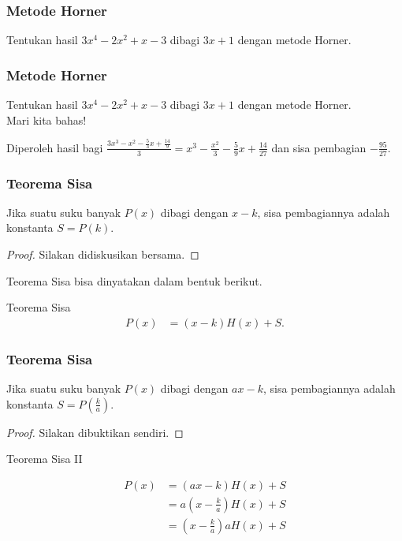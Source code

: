 \documentclass[11pt]{beamer}
\begin{document}
	\begin{frame}
		\frametitle{Metode Horner}
		Tentukan hasil $3x^4-2x^2+x-3$ dibagi $3x+1$ dengan metode Horner. 
		
	\end{frame}
	
	\begin{frame}
		\frametitle{Metode Horner}
		Tentukan hasil $3x^4-2x^2+x-3$ dibagi $3x+1$ dengan metode Horner.\\
		Mari kita bahas!
		\begin{center}
		\end{center}
		Diperoleh hasil bagi $\frac{3x^3-x^2-\frac{5}{3}x+\frac{14}{9}}{3}=x^3-\frac{x^2}{3}-\frac{5}{9}x+\frac{14}{27}$ dan sisa pembagian $-\frac{95}{27}$.
	\end{frame}
	
	\begin{frame}
		\frametitle{Teorema Sisa}
		
		\begin{theorem}
			Jika suatu suku banyak $P(x)$ dibagi dengan $x-k$, sisa pembagiannya adalah konstanta $S=P(k)$.
		\end{theorem}
		
		\begin{proof}
			Silakan didiskusikan bersama.
		\end{proof}
		
		Teorema Sisa bisa dinyatakan dalam bentuk berikut.
		\begin{block}{Teorema Sisa}
			\begin{align*}
				P(x)&=(x-k)H(x)+S.
			\end{align*}
		\end{block}
	\end{frame}
	
	\begin{frame}
		\frametitle{Teorema Sisa}
		\begin{theorem}
			Jika suatu suku banyak $P(x)$ dibagi dengan $ax-k$, sisa pembagiannya adalah konstanta $S = P(\frac{k}{a})$.
		\end{theorem}
		
		\begin{proof}
			Silakan dibuktikan sendiri.
		\end{proof}
		
		\begin{block}{Teorema Sisa II}
			
			\begin{align}
				P(x)&=(ax-k) H(x)+S\\
				&= a\left( x-\frac{k}{a} \right)   H(x) +S\\
				&= \left( x-\frac{k}{a} \right) a H(x) +S\label{sisa2}
			\end{align}
			
			
		\end{block}
	\end{frame}
		
\end{document}
